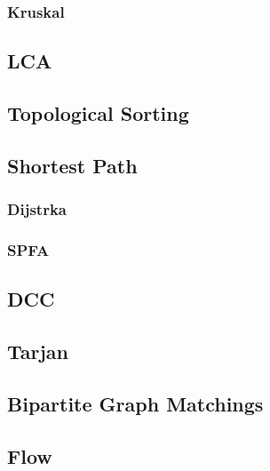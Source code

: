 \documentclass[a4paper]{article}
\begin{document}
\subsubsection{Kruskal}


\subsection{LCA}


\subsection{Topological Sorting}


\subsection{Shortest Path}

\subsubsection{Dijstrka}


\subsubsection{SPFA}


\subsection{DCC}



\subsection{Tarjan}



\subsection{Bipartite Graph Matchings}



\subsection{Flow}
\end{document}
